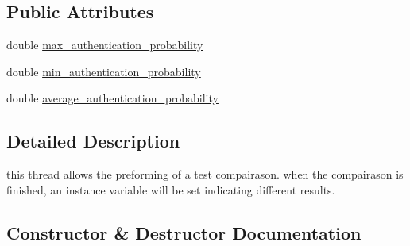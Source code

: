 \subsection*{Public Attributes}
\begin{DoxyCompactItemize}
\item 
double \hyperlink{classdata__analysis_1_1_model__compare__thread_a6213d96c54d70f9e8a2d01010414ecd3}{max\+\_\+authentication\+\_\+probability}
\item 
double \hyperlink{classdata__analysis_1_1_model__compare__thread_a8a9c58abe260de662f846876d4f7fed2}{min\+\_\+authentication\+\_\+probability}
\item 
double \hyperlink{classdata__analysis_1_1_model__compare__thread_a9a8a983509cfefb0d73b813f45fd2ef1}{average\+\_\+authentication\+\_\+probability}
\end{DoxyCompactItemize}


\subsection{Detailed Description}
this thread allows the preforming of a test compairason. when the compairason is finished, an instance variable will be set indicating different results. 

\subsection{Constructor \& Destructor Documentation}
